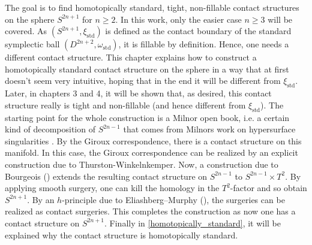 The goal is to find homotopically standard, tight, non-fillable contact structures on the sphere $S^{2n+1}$ for $n \geq 2$.
In this work, only the easier case $n \geq 3$ will be covered.
As $(S^{2n+1}, \xi_\mathrm{std})$ is defined as the contact boundary of the standard symplectic ball $(D^{2n+2}, \omega_\mathrm{std})$,
it is fillable by definition.
Hence, one needs a different contact structure.
This chapter explains how to construct a homotopically standard contact structure on the sphere in a way that at first doesn't seem very intuitive,
hoping that in the end it will be different from $\xi_\mathrm{std}$.
Later, in chapters 3 and 4, it will be shown that, as desired, this contact structure really is tight and non-fillable (and hence different from $\xi_\mathrm{std}$).
The starting point for the whole construction is a Milnor open book, i.e. a certain kind of decomposition of $S^{2n-1}$ that comes from
Milnors work on hypersurface singularities \cite{Milnor69}.
By the Giroux correspondence, there is a contact structure on this manifold.
In this case, the Giroux correspondence can be realized by an explicit construction due to Thurston-Winkelnkemper.
Now, a construction due to Bourgeois (\cite{Bourgeois02}) extends the resulting contact structure on $S^{2n-1}$ to $S^{2n-1}\times T^2$.
By applying smooth surgery, one can kill the homology in the $T^2$-factor and so obtain $S^{2n+1}$.
By an $h$-principle due to Eliashberg--Murphy (\cite[section 12.4]{EM02}), the surgeries can be realized as contact surgeries.
This completes the construction as now one has a contact structure on $S^{2n+1}$.
Finally in \cref{homotopically_standard}, it will be explained why the contact structure is homotopically standard.